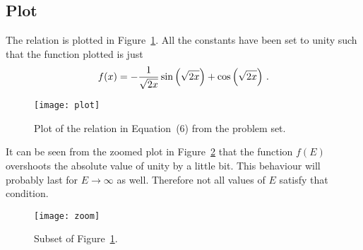\documentclass[11pt, english, fleqn, DIV=15, headinclude, BCOR=1cm]{scrartcl}
\begin{document}
\subsection{Plot}

The relation is plotted in Figure~\ref{fig:plot}. All the constants have been
set to unity such that the function plotted is just
\[
    f(x) = - \frac{1}{\sqrt{2x}} \sin\left( \sqrt{2x} \right) + \cos\left( \sqrt{2x} \right) \,.
\]

\begin{figure}[tb]
    \centering
    \texttt{[image: plot]}
    \caption{%
        Plot of the relation in Equation~(6) from the problem set.
    }
    \label{fig:plot}
\end{figure}

It can be seen from the zoomed plot in Figure~\ref{fig:zoom} that the function
$f(E)$ overshoots the absolute value of unity by a little bit. This behaviour
will probably last for $E \to \infty$ as well. Therefore not all values of $E$
satisfy that condition.

\begin{figure}[htbp]
    \centering
    \texttt{[image: zoom]}
    \caption{%
        Subset of Figure~\ref{fig:plot}.
    }
    \label{fig:zoom}
\end{figure}
\end{document}
